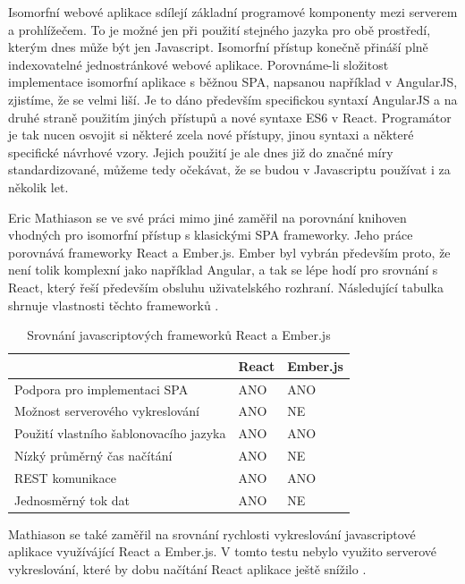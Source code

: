 Isomorfní webové aplikace sdílejí základní programové komponenty mezi serverem a prohlížečem. To je možné jen při použití stejného jazyka pro obě prostředí, kterým dnes může být jen Javascript. Isomorfní přístup konečně přináší plně indexovatelné jednostránkové webové aplikace. Porovnáme-li složitost implementace isomorfní aplikace s běžnou SPA, napsanou například v AngularJS, zjistíme, že se velmi liší. Je to dáno především specifickou syntaxí AngularJS a na druhé straně použitím jiných přístupů a nové syntaxe ES6 v React. Programátor je tak nucen osvojit si některé zcela nové přístupy, jinou syntaxi a některé specifické návrhové vzory. Jejich použití je ale dnes již do značné míry standardizované, můžeme tedy očekávat, že se budou v Javascriptu používat i za několik let. 

Eric Mathiason se ve své práci mimo jiné zaměřil na porovnání knihoven vhodných pro isomorfní přístup s klasickými SPA frameworky. Jeho práce porovnává frameworky React a Ember.js. Ember byl vybrán především proto, že není tolik komplexní jako například Angular, a tak se lépe hodí pro srovnání s React, který řeší především obsluhu uživatelského rozhraní. Následující tabulka shrnuje vlastnosti těchto frameworků \cite{mathiasson-isomorphic}.
\begin{table}[h]
\centering
	\caption{Srovnání javascriptových frameworků React a Ember.js \cite{mathiasson-isomorphic}}
	\begin{tabular}{ |p{6.5cm}|C{1.5cm}|C{1.5cm}| }
	\hline
	& React & Ember.js \\ \hline
	Podpora pro implementaci SPA & ANO & ANO \\ \hline
	Možnost serverového vykreslování & ANO & NE \\ \hline
	Použití vlastního šablonovacího jazyka & ANO & ANO \\ \hline
	Nízký průměrný čas načítání & ANO & NE \\ \hline
	REST komunikace & ANO & ANO \\ \hline
	Jednosměrný tok dat & ANO & NE \\ \hline
    \end{tabular}
	\label{tab:react_vs_ember}
\end{table}
\FloatBarrier

Mathiason se také zaměřil na srovnání rychlosti vykreslování javascriptové aplikace využívájící React a Ember.js. V tomto testu nebylo využito serverové vykreslování, které by dobu načítání React aplikace ještě snížilo \cite{mathiasson-isomorphic}.

